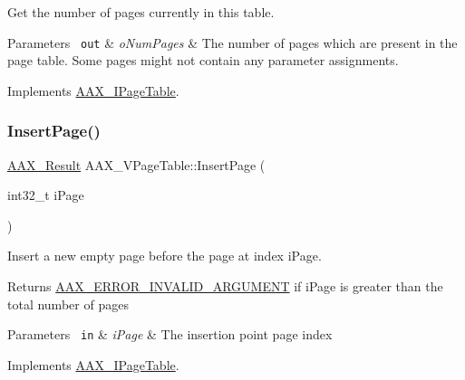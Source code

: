 Get the number of pages currently in this table. 


\begin{DoxyParams}[1]{Parameters}
\mbox{\texttt{ out}}  & {\em o\+Num\+Pages} & The number of pages which are present in the page table. Some pages might not contain any parameter assignments. \\
\hline
\end{DoxyParams}


Implements \mbox{\hyperlink{a01849_a663a8c380ff8f8234fcabb8e8619ac7d}{A\+A\+X\+\_\+\+I\+Page\+Table}}.

\mbox{\label{a01929_a65d873c58f26c3e01db0d585e15eac36}} 
\subsubsection{\texorpdfstring{InsertPage()}{InsertPage()}}
{\footnotesize\ttfamily \mbox{\hyperlink{a00392_a4d8f69a697df7f70c3a8e9b8ee130d2f}{A\+A\+X\+\_\+\+Result}} A\+A\+X\+\_\+\+V\+Page\+Table\+::\+Insert\+Page (\begin{DoxyParamCaption}\item[{int32\+\_\+t}]{i\+Page }\end{DoxyParamCaption})\hspace{0.3cm}{\ttfamily [virtual]}}



Insert a new empty page before the page at index {\ttfamily i\+Page}. 

\begin{DoxyReturn}{Returns}
\mbox{\hyperlink{a00494_a5f8c7439f3a706c4f8315a9609811937a7d27a3bd88231e331c98d85f5b10e2eb}{A\+A\+X\+\_\+\+E\+R\+R\+O\+R\+\_\+\+I\+N\+V\+A\+L\+I\+D\+\_\+\+A\+R\+G\+U\+M\+E\+NT}} if {\ttfamily i\+Page} is greater than the total number of pages
\end{DoxyReturn}

\begin{DoxyParams}[1]{Parameters}
\mbox{\texttt{ in}}  & {\em i\+Page} & The insertion point page index \\
\hline
\end{DoxyParams}


Implements \mbox{\hyperlink{a01849_a95b7b4d99253e26dd46d2deb4cf96bf8}{A\+A\+X\+\_\+\+I\+Page\+Table}}.

\mbox{\label{a01929_a15c5b3080afec26837256639525b435b}} 
